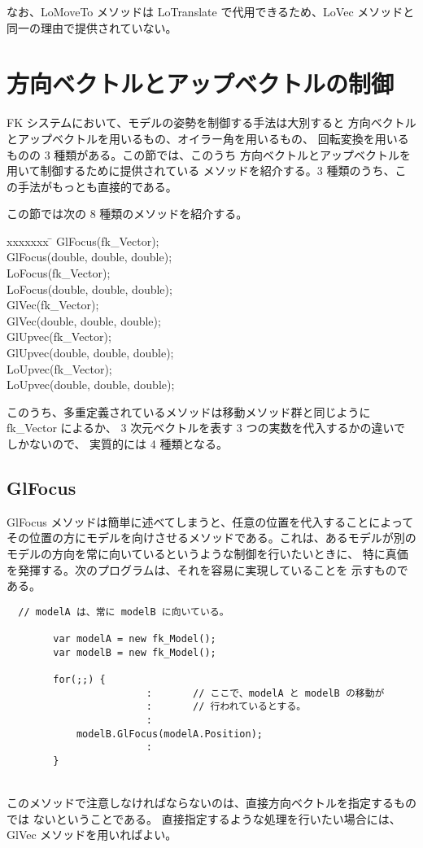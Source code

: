 なお、LoMoveTo メソッドは LoTranslate で代用できるため、LoVec メソッドと
同一の理由で提供されていない。

\section{方向ベクトルとアップベクトルの制御}
FK システムにおいて、モデルの姿勢を制御する手法は大別すると
方向ベクトルとアップベクトルを用いるもの、オイラー角を用いるもの、
回転変換を用いるものの 3 種類がある。この節では、このうち
方向ベクトルとアップベクトルを用いて制御するために提供されている
メソッドを紹介する。3 種類のうち、この手法がもっとも直接的である。

この節では次の 8 種類のメソッドを紹介する。
\begin{bf}
\begin{tabbing}
xxxxxxx \= \kill
\> GlFocus(fk\_Vector); \\
\> GlFocus(double, double, double); \\
\> LoFocus(fk\_Vector); \\
\> LoFocus(double, double, double); \\
\> GlVec(fk\_Vector); \\
\> GlVec(double, double, double); \\
\> GlUpvec(fk\_Vector); \\
\> GlUpvec(double, double, double); \\
\> LoUpvec(fk\_Vector); \\
\> LoUpvec(double, double, double); \\
\end{tabbing}
\end{bf}
このうち、多重定義されているメソッドは移動メソッド群と同じように fk\_Vector によるか、
3 次元ベクトルを表す 3 つの実数を代入するかの違いでしかないので、
実質的には 4 種類となる。

\subsection{GlFocus}
GlFocus メソッドは簡単に述べてしまうと、任意の位置を代入することによって
その位置の方にモデルを向けさせるメソッドである。これは、あるモデルが別の
モデルの方向を常に向いているというような制御を行いたいときに、
特に真価を発揮する。次のプログラムは、それを容易に実現していることを
示すものである。
\\
\begin{breakbox}
\begin{verbatim}
  // modelA は、常に modelB に向いている。

        var modelA = new fk_Model();
        var modelB = new fk_Model();

        for(;;) {
                        :       // ここで、modelA と modelB の移動が
                        :       // 行われているとする。
                        :
            modelB.GlFocus(modelA.Position);
                        :
        }
\end{verbatim}
\end{breakbox}
~ \\
このメソッドで注意しなければならないのは、直接方向ベクトルを指定するものでは
ないということである。
直接指定するような処理を行いたい場合には、GlVec メソッドを用いればよい。
